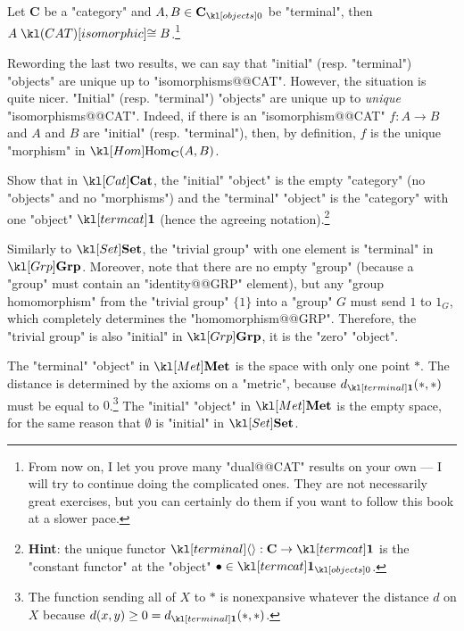 \documentclass[main.tex]{subfiles}
\begin{document}
\begin{cor}\label{cor:terminalunique}
	Let $\mathbf{C}$ be a "category" and $A,B\in \obj{\mathbf{C}}$ be "terminal", then $A \isoCAT B$.\footnote{From now on, I let you prove many "dual@@CAT" results on your own --- I will try to continue doing the complicated ones. They are not necessarily great exercises, but you can certainly do them if you want to follow this book at a slower pace.}
\end{cor}
Rewording the last two results, we can say that "initial" (resp. "terminal") "objects" are unique up to "isomorphisms@@CAT". However, the situation is quite nicer. "Initial" (resp. "terminal") "objects" are unique up to  \textit{unique} "isomorphisms@@CAT". Indeed, if there is an "isomorphism@@CAT" $f: A \rightarrow B$ and $A$ and $B$ are "initial" (resp. "terminal"), then, by definition, $f$ is the unique "morphism" in $\Hom_{\mathbf{C}}(A,B)$. %
\begin{exer}\label{exer:duality:inittermcat}
	Show that in $\catCat$, the "initial" "object" is the empty "category" (no "objects" and no "morphisms") and the "terminal" "object" is the "category" with one "object" $\termcat$ (hence the agreeing notation).\footnote{\textbf{Hint}: the unique functor $\termmorph:\mathbf{C} \rightarrow \termcat$ is the "constant functor" at the "object" $\bullet \in \obj{\termcat}$.}
\end{exer}
\begin{exmp}[$\catGrp$]
	Similarly to $\catSet$, the "trivial group" with one element is "terminal" in $\catGrp$. Moreover, note that there are no empty "group" (because a "group" must contain an "identity@@GRP" element), but any "group homomorphism" from the "trivial group" $\{1\}$ into a "group" $G$ must send $1$ to $1_G$, which completely determines the "homomorphism@@GRP". Therefore, the "trivial group" is also "initial" in $\catGrp$, it is the "zero" "object".
\end{exmp}
\begin{exmp}[$\catMet$]\label{exmp:terminitmet}
	The "terminal" "object" in $\catMet$ is the space with only one point $\ast$. The distance is determined by the axioms on a "metric", because $d_{\terminal}(\ast,\ast)$ must be equal to $0$.\footnote{The function sending all of $X$ to $\ast$ is nonexpansive whatever the distance $d$ on $X$ because $d(x,y) \geq 0 = d_{\terminal}(\ast,\ast)$.} The "initial" "object" in $\catMet$ is the empty space, for the same reason that $\emptyset$ is "initial" in $\catSet$.
\end{exmp}
\end{document}
